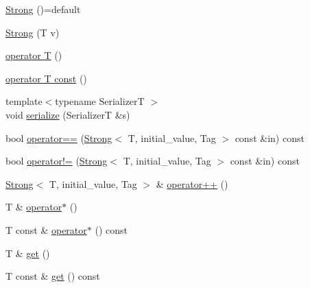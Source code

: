 \begin{DoxyCompactItemize}
\item 
\hyperlink{structvt_1_1collective_1_1reduce_1_1detail_1_1_strong_af1121c0e63f347e779f1cad333792056}{Strong} ()=default
\item 
\hyperlink{structvt_1_1collective_1_1reduce_1_1detail_1_1_strong_ad7d4a59581e1961b643c853c8e7c58c3}{Strong} (T v)
\item 
\hyperlink{structvt_1_1collective_1_1reduce_1_1detail_1_1_strong_a6390ad9dc68266d649493d5bcf83dc42}{operator T} ()
\item 
\hyperlink{structvt_1_1collective_1_1reduce_1_1detail_1_1_strong_a641850befb357381a38c66486a27f14f}{operator T const} ()
\item 
{\footnotesize template$<$typename SerializerT $>$ }\\void \hyperlink{structvt_1_1collective_1_1reduce_1_1detail_1_1_strong_a6abf31948f9dbd77f4caeb265fd68586}{serialize} (SerializerT \&s)
\item 
bool \hyperlink{structvt_1_1collective_1_1reduce_1_1detail_1_1_strong_ac8773530a7b4b1a3b5e54eb6f945c582}{operator==} (\hyperlink{structvt_1_1collective_1_1reduce_1_1detail_1_1_strong}{Strong}$<$ T, initial\+\_\+value, Tag $>$ const \&in) const
\item 
bool \hyperlink{structvt_1_1collective_1_1reduce_1_1detail_1_1_strong_a82bf11914af5ac09c78eb102fb04607a}{operator!=} (\hyperlink{structvt_1_1collective_1_1reduce_1_1detail_1_1_strong}{Strong}$<$ T, initial\+\_\+value, Tag $>$ const \&in) const
\item 
\hyperlink{structvt_1_1collective_1_1reduce_1_1detail_1_1_strong}{Strong}$<$ T, initial\+\_\+value, Tag $>$ \& \hyperlink{structvt_1_1collective_1_1reduce_1_1detail_1_1_strong_a403ac1145637bfab0550181b5f7bdd5f}{operator++} ()
\item 
T \& \hyperlink{structvt_1_1collective_1_1reduce_1_1detail_1_1_strong_ae4f668ef8de598177396f4dc575fce3c}{operator$\ast$} ()
\item 
T const  \& \hyperlink{structvt_1_1collective_1_1reduce_1_1detail_1_1_strong_abddd678b81243106268873116676f135}{operator$\ast$} () const
\item 
T \& \hyperlink{structvt_1_1collective_1_1reduce_1_1detail_1_1_strong_a410692a65741df1c5e3a5498f22717c6}{get} ()
\item 
T const  \& \hyperlink{structvt_1_1collective_1_1reduce_1_1detail_1_1_strong_a329a5157d759c1c413380b495d23c79f}{get} () const
\end{DoxyCompactItemize}


